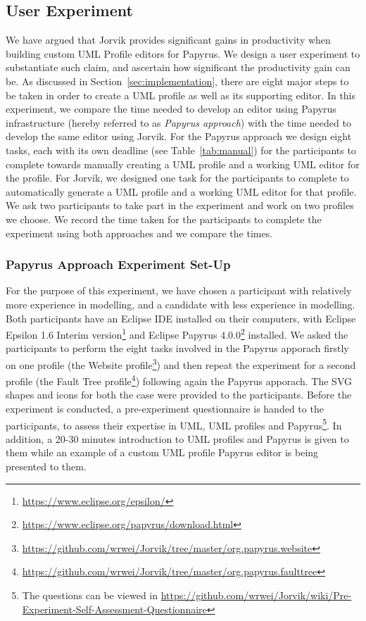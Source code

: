 \subsection{User Experiment}
We have argued that Jorvik provides significant gains in productivity when building custom UML Profile editors for Papyrus.
We design a user experiment to substantiate such claim, and ascertain how significant the productivity gain can be.
As discussed in Section~\ref{sec:implementation}, there are eight major steps to be taken in order to create a UML profile as well as its supporting editor. 
In this experiment, we compare the time needed to develop an editor using Papyrus infrastructure (hereby referred to as \textit{Papyrus approach}) with the time needed to develop the same editor using Jorvik.
For the Papyrus approach we design eight tasks, each with its own deadline (see Table~\ref{tab:manual}) for the participants to complete towards manually creating a UML profile and a working UML editor for the profile.
For Jorvik, we designed one task for the participants to complete to automatically generate a UML profile and a working UML editor for that profile.
We ask two participants to take part in the experiment and work on two profiles we choose. 
We record the time taken for the participants to complete the experiment using both approaches and we compare the times.

\subsubsection{Papyrus Approach Experiment Set-Up}
For the purpose of this experiment, we have chosen a participant with relatively more experience in modelling, and a candidate with less experience in modelling. 
Both participants have an Eclipse IDE installed on their computers, with Eclipse Epsilon 1.6 Interim version\footnote{\url{https://www.eclipse.org/epsilon/}} and Eclipse Papyrus 4.0.0\footnote{\url{https://www.eclipse.org/papyrus/download.html}} installed.
We asked the participants to perform the eight tasks involved in the Papyrus apporach firstly on one profile (the Website profile\footnote{\url{https://github.com/wrwei/Jorvik/tree/master/org.papyrus.website}}) and then repeat the experiment for a second profile (the Fault Tree profile\footnote{\url{https://github.com/wrwei/Jorvik/tree/master/org.papyrus.faulttree}}) following again the Papyrus apporach. 
The SVG shapes and icons for both the case were provided to the participants. 
Before the experiment is conducted, a pre-experiment questionnaire is handed to the participants, to assess their expertise in UML, UML profiles and Papyrus\footnote{The questions can be viewed in \url{https://github.com/wrwei/Jorvik/wiki/Pre-Experiment-Self-Assessment-Questionnaire}}. 
In addition, a 20-30 minutes introduction to UML profiles and Papyrus is given to them while an example of a custom UML profile Papyrus editor is being presented to them. 

